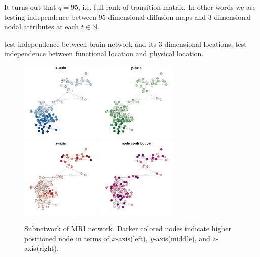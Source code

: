 \documentclass[12pt]{article}
\theoremstyle{definition}
\begin{document}
It turns out that $q=95$, i.e. full rank of transition matrix. In other words we are testing independence between 95-dimensional diffusion maps and 3-dimensional nodal attributes at each $t \in \mathbb{N}$.
	
	
test independence between brain network and its 3-dimensional locations; test independence between functional location and physical location. 
	
\begin{figure}[H]
	\centering
		\includegraphics[width=1.5in]{../Figure/brain1_x.pdf}
		\includegraphics[width=1.5in]{../Figure/brain1_y.pdf}
		\includegraphics[width=1.5in]{../Figure/brain1_z.pdf}
		\includegraphics[width=1.5in]{../Figure/brain1_weight.pdf}
	\caption{Subnetwork of MRI network. Darker colored nodes indicate higher positioned node in terms of $x$-axis(left), $y$-axis(middle), and $z$-axis(right).}
		\label{fig:mri}
\end{figure}
	
\end{document}
